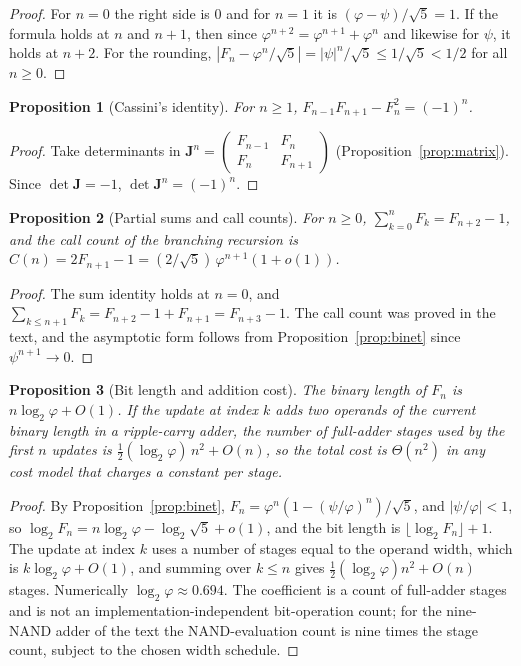 \documentclass[11pt]{article}
\newtheorem{proposition}{Proposition}
\theoremstyle{definition}
\theoremstyle{remark}
\begin{document}
\begin{proof}
For $n = 0$ the right side is $0$ and for $n = 1$ it is $(\varphi - \psi)/\sqrt5 = 1$. If the formula holds at $n$ and $n+1$, then since $\varphi^{n+2} = \varphi^{n+1} + \varphi^{n}$ and likewise for $\psi$, it holds at $n+2$. For the rounding, $|F_n - \varphi^n/\sqrt5| = |\psi|^n/\sqrt5 \le 1/\sqrt5 < 1/2$ for all $n \ge 0$.
\end{proof}

\begin{proposition}[Cassini's identity]\label{prop:cassini}
For $n \ge 1$, $F_{n-1} F_{n+1} - F_n^{2} = (-1)^{n}$.
\end{proposition}

\begin{proof}
Take determinants in $\mathbf{J}^{n} = \begin{pmatrix}F_{n-1}&F_n\\F_n&F_{n+1}\end{pmatrix}$ (Proposition~\ref{prop:matrix}). Since $\det \mathbf{J} = -1$, $\det \mathbf{J}^{n} = (-1)^{n}$.
\end{proof}

\begin{proposition}[Partial sums and call counts]\label{prop:sums}
For $n \ge 0$, $\sum_{k=0}^{n} F_k = F_{n+2} - 1$, and the call count of the branching recursion is $C(n) = 2F_{n+1} - 1 = (2/\sqrt5)\,\varphi^{n+1}(1 + o(1))$.
\end{proposition}

\begin{proof}
The sum identity holds at $n = 0$, and $\sum_{k \le n+1} F_k = F_{n+2} - 1 + F_{n+1} = F_{n+3} - 1$. The call count was proved in the text, and the asymptotic form follows from Proposition~\ref{prop:binet} since $\psi^{n+1} \to 0$.
\end{proof}

\begin{proposition}[Bit length and addition cost]\label{prop:bitlength}
The binary length of $F_n$ is $n \log_2 \varphi + O(1)$. If the update at index $k$ adds two operands of the current binary length in a ripple-carry adder, the number of full-adder stages used by the first $n$ updates is $\tfrac12 (\log_2 \varphi)\, n^{2} + O(n)$, so the total cost is $\Theta(n^2)$ in any cost model that charges a constant per stage.
\end{proposition}

\begin{proof}
By Proposition~\ref{prop:binet}, $F_n = \varphi^n (1 - (\psi/\varphi)^n)/\sqrt5$, and $|\psi/\varphi| < 1$, so $\log_2 F_n = n \log_2 \varphi - \log_2 \sqrt5 + o(1)$, and the bit length is $\lfloor \log_2 F_n \rfloor + 1$. The update at index $k$ uses a number of stages equal to the operand width, which is $k \log_2 \varphi + O(1)$, and summing over $k \le n$ gives $\tfrac12 (\log_2 \varphi) n^2 + O(n)$ stages. Numerically $\log_2 \varphi \approx 0.694$. The coefficient is a count of full-adder stages and is not an implementation-independent bit-operation count; for the nine-NAND adder of the text the NAND-evaluation count is nine times the stage count, subject to the chosen width schedule.
\end{proof}
\end{document}

